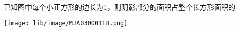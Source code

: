 已知图中每个小正方形的边长为1，则阴影部分的面积占整个长方形面积的\key{\hspace{1cm}}


\begin{center}

    \texttt{[image: lib/image/MJA03000118.png]}

\end{center}




